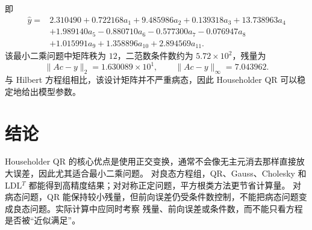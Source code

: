 \documentclass[a4paper,11pt]{article}
\begin{document}
即
\[
\begin{aligned}
\hat y={}&2.310490+0.722168a_1+9.485986a_2+0.139318a_3+13.738963a_4\\
&+1.989140a_5-0.880710a_6-0.577300a_7-0.076947a_8\\
&+1.015991a_9+1.358896a_{10}+2.894569a_{11}.
\end{aligned}
\]
该最小二乘问题中矩阵秩为 $12$，二范数条件数约为 $5.72\times10^2$，残量为
\[
    \|Ac-y\|_2=1.630089\times10^1,\qquad
    \|Ac-y\|_\infty=7.043962.
\]
与 Hilbert 方程组相比，该设计矩阵并不严重病态，因此 Householder QR 可以稳定地给出模型参数。

\section{结论}
Householder QR 的核心优点是使用正交变换，通常不会像无主元消去那样直接放大误差，因此尤其适合最小二乘问题。
对良态方程组，QR、Gauss、Cholesky 和 LDL$^T$ 都能得到高精度结果；对对称正定问题，平方根类方法更节省计算量。
对病态问题，QR 能保持较小残量，但前向误差仍受条件数控制，不能把病态问题变成良态问题。实际计算中应同时考察
残量、前向误差或条件数，而不能只看方程是否被“近似满足”。
\end{document}

